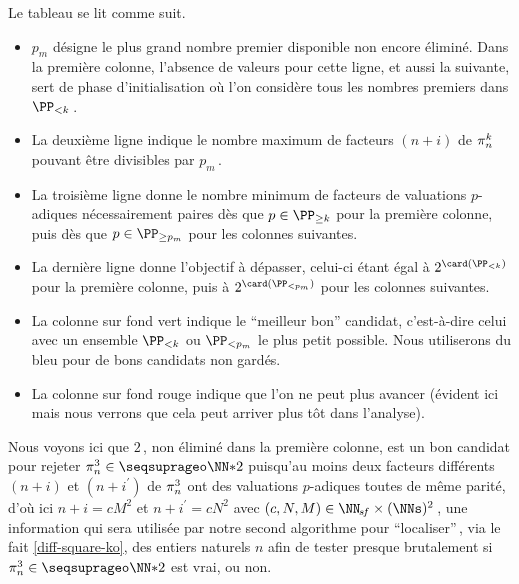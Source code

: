 Le tableau se lit comme suit.
%
\begin{itemize}
	\item $p_m$ désigne le plus grand nombre premier disponible non encore éliminé. Dans la première colonne, l'absence de valeurs pour cette ligne, et aussi la suivante, sert de phase d'initialisation où l'on considère tous les nombres premiers dans $\PP_{< k}$\,.

	\item La deuxième ligne indique le nombre maximum de facteurs $(n+i)$ de $\consprod$ pouvant être divisibles par $p_m$\,.

	\item La troisième ligne donne le nombre minimum de facteurs de valuations $p$-adiques nécessairement paires 
	dès que $p \in \PP_{\geq k}$ pour la première colonne, puis 
	dès que $p \in \PP_{\geq p_m}$ pour les colonnes suivantes.

	\item La dernière ligne donne l'objectif à dépasser, celui-ci étant égal 
	à $2^{\card( \PP_{< k} )}$ pour la première colonne, puis
	à $2^{\card( \PP_{< p_m} )}$ pour les colonnes suivantes.
	

	\item La colonne sur fond vert indique le \enquote{meilleur bon} candidat, c'est-à-dire celui avec un ensemble $\PP_{< k}$ ou $\PP_{< p_m} $ le plus petit possible.
	Nous utiliserons du bleu pour de bons candidats non gardés.

	\item La colonne sur fond rouge indique que l'on ne peut plus avancer (évident ici mais nous verrons que cela peut arriver plus tôt dans l'analyse).
\end{itemize}


Nous voyons ici que $2$\,, non éliminé dans la première colonne, est un bon candidat pour rejeter $\consprod<3> \in \NNssquare$ puisqu'au moins deux facteurs différents $(n+i)$ et $(n+i^\prime)$ de $\consprod<3>$ ont des valuations $p$-adiques toutes de même parité, d'où ici $n+i = c M^2$ et $n+i^\prime = c N^2$ avec $(c, N, M) \in \NNsf \times ( \NNs )^2$\,, une information qui sera utilisée par notre second algorithme pour \enquote{localiser}\,, via le fait \ref{diff-square-ko}, des entiers naturels $n$ afin de tester presque brutalement si $\consprod<3> \in \NNssquare$ est vrai, ou non.


